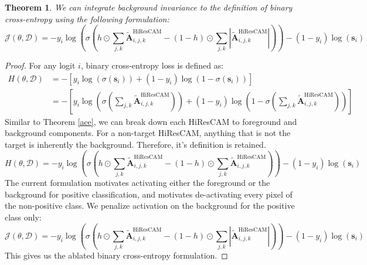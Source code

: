 \documentclass{article}
\theoremstyle{plain}
\newtheorem{theorem}{Theorem}[section]
\theoremstyle{definition}
\theoremstyle{remark}
\begin{document}
\begin{theorem}\label{abce}
	We can integrate background invariance to the definition of binary cross-entropy using the following formulation:
	\begin{equation}
		\mathcal{J}(\theta, \mathcal{D}) = - y_i \log \left(\sigma\left(h \odot \sum_{j,k}\tilde{\mathcal{\bm{A}}}_{i,j,k}^{\text{HiResCAM}} - (1-h) \odot \sum_{j,k}|\tilde{\mathcal{\bm{A}}}_{i,j,k}^{\text{HiResCAM}}|\right) \right) - (1 - y_i) \log \left( \bm{s}_i \right)
	\end{equation}
\end{theorem}
\begin{proof} For any logit $i$, binary cross-entropy loss is defined as:
	\begin{align}
		H(\theta, \mathcal{D}) &= -\left[ y_i \log (\sigma(\bm{s}_i)) + (1 - y_i) \log (1 - \sigma(\bm{s}_i)) \right] \\
		&= -\left[ y_i \log \left(\sigma\left(\sum_{j,k}\tilde{\mathcal{\bm{A}}}_{i,j,k}^{\text{HiResCAM}}\right) \right) + (1 - y_i) \log \left(1 - \sigma\left(\sum_{j,k}\tilde{\mathcal{\bm{A}}}_{i,j,k}^{\text{HiResCAM}}\right) \right) \right]
	\end{align}
	Similar to Theorem \ref{ace}, we can break down each HiResCAM to foreground and background components. For a non-target HiResCAM, anything that is not the target is inherently the background. Therefore, it's definition is retained.
	\begin{equation}
		H(\theta, \mathcal{D}) = - y_i \log \left(\sigma\left(h \odot \sum_{j,k}\tilde{\mathcal{\bm{A}}}_{i,j,k}^{\text{HiResCAM}} - (1-h) \odot \sum_{j,k}\tilde{\mathcal{\bm{A}}}_{i,j,k}^{\text{HiResCAM}}\right) \right) - (1 - y_i) \log \left( \bm{s}_i \right)
	\end{equation}
	The current formulation motivates activating either the foreground or the background for positive classification, and motivates de-activating every pixel of the non-positive class. We penalize activation on the background for the positive class only:
	\begin{equation}
		\mathcal{J}(\theta, \mathcal{D}) = - y_i \log \left(\sigma\left(h \odot \sum_{j,k}\tilde{\mathcal{\bm{A}}}_{i,j,k}^{\text{HiResCAM}} - (1-h) \odot \sum_{j,k}|\tilde{\mathcal{\bm{A}}}_{i,j,k}^{\text{HiResCAM}}|\right) \right) - (1 - y_i) \log \left( \bm{s}_i \right)
	\end{equation}
	This gives us the ablated binary cross-entropy formulation.
\end{proof}
\end{document}
